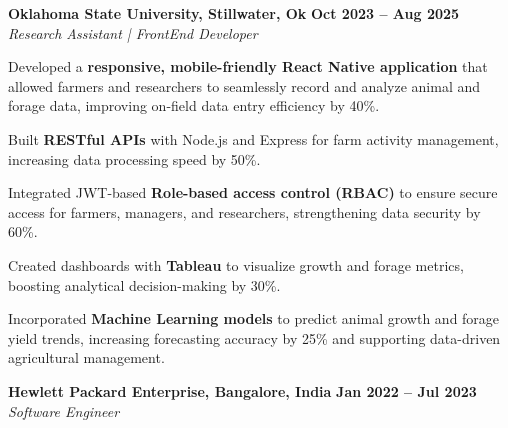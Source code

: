 \documentclass[letterpaper,10pt]{article}
\newcommand{\heading}[2]{
  \hspace{1pt}#1\hfill#2\\
}
\newcommand{\headingBf}[2]{
  \heading{\textbf{#1}}{\textbf{#2}}
}
\newcommand{\headingIt}[2]{
  \heading{\textit{#1}}{\textit{#2}}
}
\newenvironment{resume_list}{
  \vspace{-7pt}
  \begin{itemize}[itemsep=-1.5px, parsep=1pt, leftmargin=10pt]
}{
  \end{itemize}
}
\begin{document}
  \headingBf{Oklahoma State University, Stillwater, Ok}{ Oct 2023 -- Aug 2025}
  \headingIt{Research Assistant | FrontEnd Developer}{}
  \begin{resume_list}
    \item Developed a \textbf{responsive, mobile-friendly React Native application} that allowed farmers and researchers to seamlessly record and analyze animal and forage data, improving on-field data entry efficiency by 40\%.
    \vspace{1.5pt}
    \item Built \textbf{RESTful APIs} with Node.js and Express for farm activity management, increasing data processing speed by 50\%.
    \vspace{1.5pt}
    \item Integrated JWT-based \textbf{Role-based access control (RBAC)} to ensure secure access for farmers, managers, and researchers, strengthening data security by 60\%.
    \vspace{1.5pt}
    \item Created dashboards with \textbf{Tableau} to visualize growth and forage metrics, boosting analytical decision-making by 30\%.
    \vspace{1.5pt}
    \item Incorporated \textbf{Machine Learning models} to predict animal growth and forage yield trends, increasing forecasting accuracy by 25\% and supporting data-driven agricultural management.
    \end{resume_list}
\headingBf{Hewlett Packard Enterprise, Bangalore, India}{ Jan 2022 -- Jul 2023}
  \headingIt{Software Engineer}{}
\end{document}
